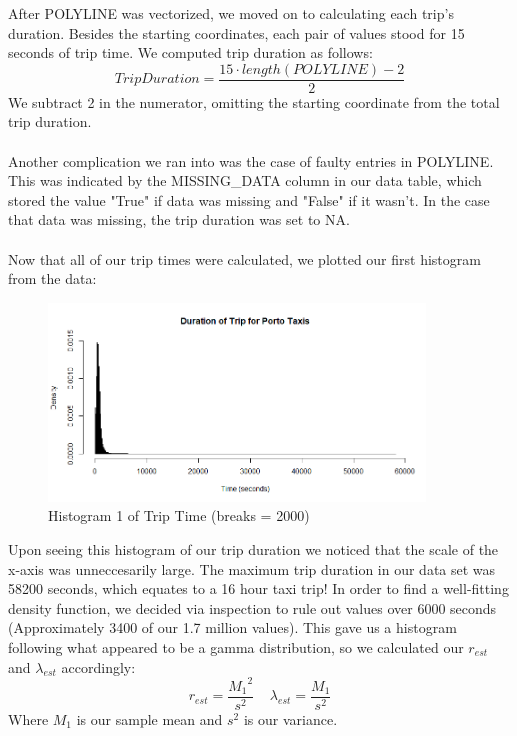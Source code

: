 \documentclass[letterpaper, 12 pt, conference]{article}
\begin{document}
\begin{enumerate}
    After POLYLINE was vectorized, we moved on to calculating each trip's duration. Besides the starting coordinates, each pair of values stood for 15 seconds of trip time. We computed trip duration as follows:
         \begin{equation} 
         Trip Duration = \frac{15 \cdot length(POLYLINE)-2}{2}
         \end{equation} 
    We subtract 2 in the numerator, omitting the starting coordinate from the total trip duration.
    \\\\
    Another complication we ran into was the case of faulty entries in POLYLINE. This was indicated by the MISSING\_DATA column in our data table, which stored the value "True" if data was missing and "False" if it wasn't. In the case that data was missing, the trip duration was set to NA.
    \\\\
    Now that all of our trip times were calculated, we plotted our first histogram from the data:
    \begin{figure}[H]
    \centering
    \includegraphics[width=10cm]{B1Hist0.png}
    \caption{Histogram 1 of Trip Time (breaks = 2000)}
    \label{fig:b1histo0}
    \end{figure}
    Upon seeing this histogram of our trip duration we noticed that the scale of the x-axis was unneccesarily large. The maximum trip duration in our data set was 58200 seconds, which equates to a 16 hour taxi trip! In order to find a well-fitting density function, we decided via inspection to rule out values over 6000 seconds (Approximately 3400 of our 1.7 million values). This gave us a histogram following what appeared to be a gamma distribution, so we calculated our $r_{est}$ and $\lambda_{est}$ accordingly:
    \begin{equation}
         r_{est} = \frac{{M_1}^2}{s^2} \;\;\;\; \lambda_{est} = \frac{M_1}{s^2} 
    \end{equation}
    Where $M_1$ is our sample mean and $s^2$ is our variance.

\end{enumerate}
\end{document}
